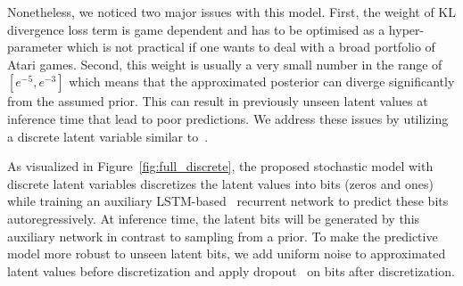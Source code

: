 Nonetheless, we noticed two major issues with this model. First, the weight of KL divergence loss term is game dependent and has to be optimised as a hyper-parameter which is not practical if one wants to deal with a broad portfolio of Atari games. Second, this weight is usually a very small number in the range of $[e^{-5}, e^{-3}]$ which means that the approximated posterior can diverge significantly from the assumed prior. This can result in previously unseen latent values at inference time that lead to poor predictions. We address these issues by utilizing a discrete latent variable similar to~\citet{auto_discrete}. 

As visualized in Figure~\ref{fig:full_discrete}, the proposed stochastic model with discrete latent variables discretizes the latent values into bits (zeros and ones) while training an auxiliary LSTM-based~\cite{hochreiter1997long} recurrent network to predict these bits autoregressively. At inference time, the latent bits will be generated by this auxiliary network in contrast to sampling from a prior. To make the predictive model more robust to unseen latent bits, we add uniform noise to approximated latent values before discretization and apply dropout~\cite{srivastava2014dropout} on bits after discretization.



